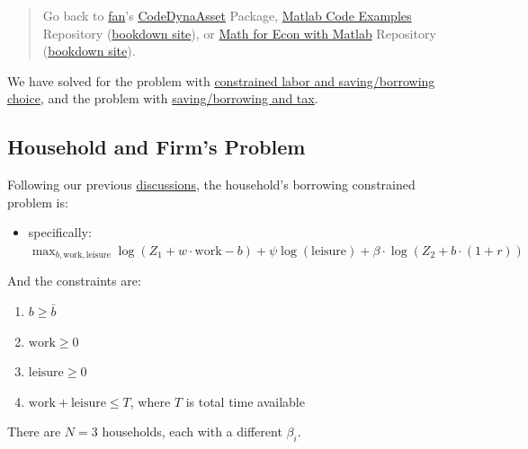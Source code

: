\documentclass[
]{book}
\providecommand{\tightlist}{%
  \setlength{\itemsep}{0pt}\setlength{\parskip}{0pt}}
\begin{document}
\begin{quote}
Go back to \href{http://fanwangecon.github.io/}{fan}'s \href{https://fanwangecon.github.io/CodeDynaAsset/}{CodeDynaAsset} Package, \href{https://fanwangecon.github.io/M4Econ/}{Matlab Code Examples} Repository (\href{https://fanwangecon.github.io/M4Econ/bookdown}{bookdown site}), or \href{https://fanwangecon.github.io/Math4Econ/}{Math for Econ with Matlab} Repository (\href{https://fanwangecon.github.io/Math4Econ/bookdown}{bookdown site}).
\end{quote}

We have solved for the problem with \href{https://fanwangecon.github.io/Math4Econ/optimization_application/household_asset_labor_constrained.html}{constrained labor and
saving/borrowing
choice},
and the problem with \href{https://fanwangecon.github.io/Math4Econ/equilibrium/equilibrium_constrainedborrow.html}{saving/borrowing and
tax}.

\hypertarget{household-and-firms-problem}{%
\subsection{Household and Firm's Problem}\label{household-and-firms-problem}}

Following our previous
\href{https://fanwangecon.github.io/Math4Econ/optimization_application/household_asset_labor_constrained.html}{discussions},
the household's borrowing constrained problem is:

\begin{itemize}
\tightlist
\item
  specifically:
  \(\max_{b,\textrm{work},\textrm{leisure}} \log (Z_1 +w\cdot \textrm{work}-b)+\psi \log (\textrm{leisure})+\beta \cdot \log (Z_2 +b\cdot (1+r))\)
\end{itemize}

And the constraints are:

\begin{enumerate}
\def\labelenumi{\arabic{enumi}.}
\item
  \(\displaystyle b\ge \bar{b}\)
\item
  \(\displaystyle \textrm{work}\ge 0\)
\item
  \(\displaystyle \textrm{leisure}\ge 0\)
\item
  \(\textrm{work}+\textrm{leisure}\le T\), where \(T\) is total time
  available
\end{enumerate}

There are \(N=3\) households, each with a different \(\beta_i\).
\end{document}
